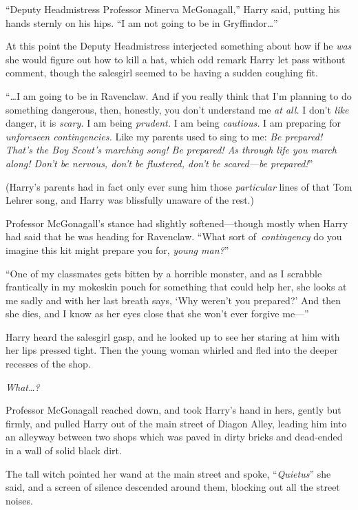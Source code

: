 “Deputy Headmistress Professor Minerva McGonagall,” Harry said, putting his hands sternly on his hips. “I am not going to be in Gryffindor…”

At this point the Deputy Headmistress interjected something about how if he \emph{was} she would figure out how to kill a hat, which odd remark Harry let pass without comment, though the salesgirl seemed to be having a sudden coughing fit.

“…I am going to be in Ravenclaw. And if you really think that I’m planning to do something dangerous, then, honestly, you don’t understand me \emph{at all.} I don’t \emph{like} danger, it is \emph{scary.} I am being \emph{prudent.} I am being \emph{cautious.} I am preparing for \emph{unforeseen contingencies.} Like my parents used to sing to me: \emph{Be prepared! That’s the Boy Scout’s marching song! Be prepared! As through life you march along! Don’t be nervous, don’t be flustered, don’t be scared—be prepared!}”

(Harry’s parents had in fact only ever sung him those \emph{particular} lines of that Tom Lehrer song, and Harry was blissfully unaware of the rest.)

Professor McGonagall’s stance had slightly softened—though mostly when Harry had said that he was heading for Ravenclaw. “What sort of\linebreak\ \emph{contingency} do you imagine this kit might prepare you for, \emph{young man?}”

“One of my classmates gets bitten by a horrible monster, and as I scrabble frantically in my mokeskin pouch for something that could help her, she looks at me sadly and with her last breath says, ‘Why weren’t you prepared?’ And then she dies, and I know as her eyes close that she won’t ever forgive me—”

Harry heard the salesgirl gasp, and he looked up to see her staring at him with her lips pressed tight. Then the young woman whirled and fled into the deeper recesses of the shop.

\emph{What…?}

Professor McGonagall reached down, and took Harry’s hand in hers, gently but firmly, and pulled Harry out of the main street of Diagon Alley, leading him into an alleyway between two shops which was paved in dirty bricks and dead-ended in a wall of solid black dirt.

The tall witch pointed her wand at the main street and spoke, “\emph{Quietus}” she said, and a screen of silence descended around them, blocking out all the street noises.

